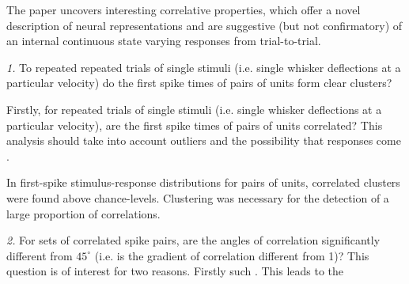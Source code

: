 \documentclass{article}
\begin{document}

The paper uncovers interesting correlative properties, which offer a novel description of neural representations and are suggestive (but not confirmatory) of an internal continuous state varying responses from trial-to-trial. 






\textit{1.} To repeated repeated trials of single stimuli (i.e. single whisker deflections at a particular velocity) do the first spike times of pairs of units form clear clusters? 


Firstly, for repeated trials of single stimuli (i.e. single whisker deflections at a particular velocity), are the first spike times of pairs of units correlated? This analysis should take into account outliers and the possibility that responses come .

In first-spike stimulus-response distributions for pairs of units, correlated clusters were found above chance-levels. Clustering was necessary for the detection of a large proportion of correlations.

\textit{2.} For sets of correlated spike pairs, are the angles of correlation significantly different from $45^{\circ}$ (i.e. is the gradient of correlation different from 1)? This question is of interest for two reasons. Firstly such . This leads to the 
\end{document}
